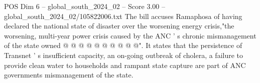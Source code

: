 \begin{textsample}{POS Dim 6 – global\_south\_2024\_02 – Score 3.00 – global\_south\_2024\_02/105822006.txt}
The bill accuses Ramaphosa of having declared the national state of disaster over the worsening energy crisis,"the worsening, multi-year power crisis caused by the ANC ' s chronic mismanagement of the state owned @ @ @ @ @ @ @ @ @ @".
It states that the persistence of Transnet ' s insufficient capacity, an on-going outbreak of cholera, a failure to provide clean water to households and rampant state capture are part of ANC governments mismanagement of the state.

\end{textsample}
